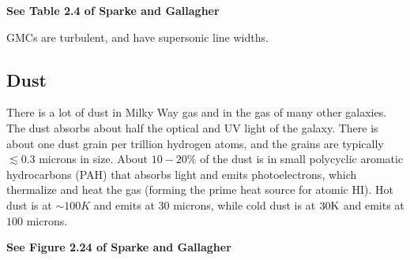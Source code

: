 \documentclass[]{article}
\begin{document}
{\bf See Table 2.4 of Sparke and Gallagher}

GMCs are turbulent, and have supersonic line widths.

\subsection{Dust}

There is a lot of dust in Milky Way gas and in the
gas of many other galaxies.  The dust absorbs about
half the optical and UV light of the galaxy.  There
is about one dust grain per trillion hydrogen atoms,
and the grains are typically $\lesssim0.3$ microns
in size. About $10-20\%$ of the dust is in small
polycyclic aromatic hydrocarbons (PAH) that absorbs
light and emits photoelectrons, which thermalize
and heat the gas (forming the prime heat source for
atomic HI).  Hot dust is at $\sim100K$ and emits at
$30$ microns, while cold dust is at $30\mathrm{K}$ and
emits at $100$ microns.


{\bf See Figure 2.24 of Sparke and Gallagher}
\end{document}
